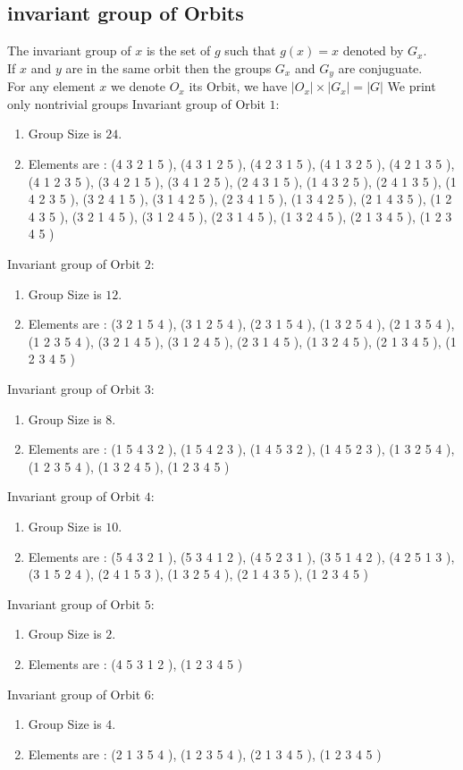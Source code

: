 \documentclass[12pt]{article}
\begin{document}
\subsection{invariant group of Orbits}
\noindent The invariant group of $x$ is the set of $g$ such that $g(x)=x$ denoted by $G_x$.\\
If $x$ and $y$ are in the same orbit then the groups $G_x$ and  $G_y$ are conjuguate.\\
For any element $x$ we denote $O_x$ its Orbit, we have $|O_x|\times |G_x|=|G|$
We print only nontrivial groups
Invariant group of Orbit $1$:
\begin{enumerate}
\item Group Size is $24$.
\item Elements are : (4 3 2 1 5  ), (4 3 1 2 5  ), (4 2 3 1 5  ), (4 1 3 2 5  ), (4 2 1 3 5  ), (4 1 2 3 5  ), (3 4 2 1 5  ), (3 4 1 2 5  ), (2 4 3 1 5  ), (1 4 3 2 5  ), (2 4 1 3 5  ), (1 4 2 3 5  ), (3 2 4 1 5  ), (3 1 4 2 5  ), (2 3 4 1 5  ), (1 3 4 2 5  ), (2 1 4 3 5  ), (1 2 4 3 5  ), (3 2 1 4 5  ), (3 1 2 4 5  ), (2 3 1 4 5  ), (1 3 2 4 5  ), (2 1 3 4 5  ), (1 2 3 4 5  )
\end{enumerate}
Invariant group of Orbit $2$:
\begin{enumerate}
\item Group Size is $12$.
\item Elements are : (3 2 1 5 4  ), (3 1 2 5 4  ), (2 3 1 5 4  ), (1 3 2 5 4  ), (2 1 3 5 4  ), (1 2 3 5 4  ), (3 2 1 4 5  ), (3 1 2 4 5  ), (2 3 1 4 5  ), (1 3 2 4 5  ), (2 1 3 4 5  ), (1 2 3 4 5  )
\end{enumerate}
Invariant group of Orbit $3$:
\begin{enumerate}
\item Group Size is $8$.
\item Elements are : (1 5 4 3 2  ), (1 5 4 2 3  ), (1 4 5 3 2  ), (1 4 5 2 3  ), (1 3 2 5 4  ), (1 2 3 5 4  ), (1 3 2 4 5  ), (1 2 3 4 5  )
\end{enumerate}
Invariant group of Orbit $4$:
\begin{enumerate}
\item Group Size is $10$.
\item Elements are : (5 4 3 2 1  ), (5 3 4 1 2  ), (4 5 2 3 1  ), (3 5 1 4 2  ), (4 2 5 1 3  ), (3 1 5 2 4  ), (2 4 1 5 3  ), (1 3 2 5 4  ), (2 1 4 3 5  ), (1 2 3 4 5  )
\end{enumerate}
Invariant group of Orbit $5$:
\begin{enumerate}
\item Group Size is $2$.
\item Elements are : (4 5 3 1 2  ), (1 2 3 4 5  )
\end{enumerate}
Invariant group of Orbit $6$:
\begin{enumerate}
\item Group Size is $4$.
\item Elements are : (2 1 3 5 4  ), (1 2 3 5 4  ), (2 1 3 4 5  ), (1 2 3 4 5  )
\end{enumerate}
\end{document}
